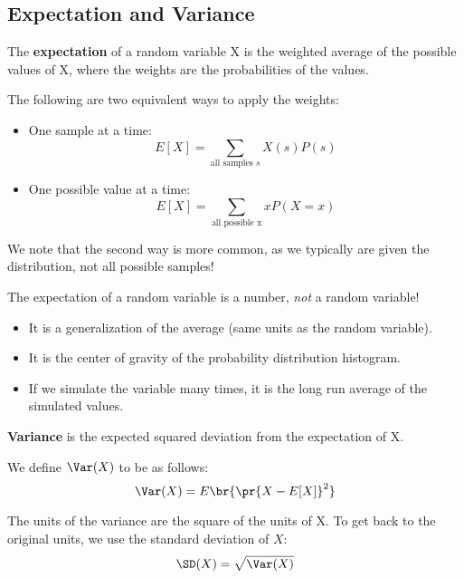\documentclass[openany]{book}
\begin{document}
\subsection{Expectation and Variance}
\begin{defn}[Expectation]
	The \textbf{expectation} of a random variable X is the weighted average of the possible values of X, where the weights are the probabilities of the values.
\end{defn}

The following are two equivalent ways to apply the weights:
\begin{itemize}
	\item One sample at a time:
	\begin{equation*}
		E[X] = \sum_{\text{all samples $s$}} X(s)P(s)
	\end{equation*}
	\item One possible value at a time:
	\begin{equation*}
		E[X] = \sum_{\text{all possible x}} xP(X=x)
	\end{equation*}
\end{itemize}

We note that the second way is more common, as we typically are given the distribution, not all possible samples!

\begin{warn}
	The expectation of a random variable is a number, \textit{not} a random variable! 
	\begin{itemize}
		\item It is a generalization of the average (same units as the random variable).
		\item It is the center of gravity of the probability distribution histogram.
		\item If we simulate the variable many times, it is the long run average of the simulated values.
	\end{itemize}
\end{warn}

\begin{defn}[Variance]
	\textbf{Variance} is the expected squared deviation from the expectation of X.
\end{defn}

We define $\Var(X)$ to be as follows:
\begin{equation*}
	\Var(X) = E\br{ \pr{X - E[X]}^{2}}
\end{equation*}

\begin{rmk}
	The units of the variance are the square of the units of X. To get back to the original units, we use the standard deviation of $X$:
	\begin{equation*}
		\SD(X) = \sqrt{\Var(X)}
	\end{equation*}
\end{rmk}
\end{document}
